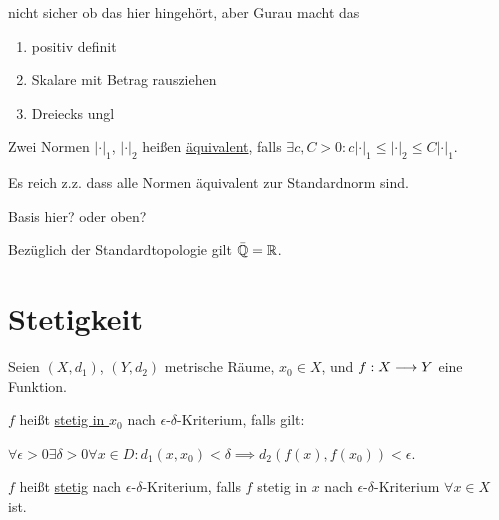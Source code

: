 \begin{query}
    nicht sicher ob das hier hingehört, aber Gurau macht das
\end{query}

\begin{definition}[Norm]
    \begin{enumerate}[label=(N\arabic*)]
        \item positiv definit
        \item Skalare mit Betrag rausziehen
        \item Dreiecks ungl
    \end{enumerate}
\end{definition}

\begin{definition}[Normäquivalenz]
    Zwei Normen $|\cdot|_1$, $|\cdot|_2$ heißen \underline{äquivalent}, falls $\exists c, C > 0: c |\cdot|_1 \leq |\cdot|_2 \leq C |\cdot|_1$.
\end{definition}

\begin{example}
    
\end{example}

\begin{proposition}
    Es reich z.z. dass alle Normen äquivalent zur Standardnorm sind.
\end{proposition}

Basis hier? oder oben?

\begin{lemma}
    Bezüglich der Standardtopologie gilt $\bar{\mathbb{Q}} = \mathbb{R}$.
\end{lemma}



\section{Stetigkeit}

\begin{definition}
    Seien $(X, d_1)$, $(Y, d_2)$ metrische Räume, $x_0 \in X$, und $f: X \longrightarrow Y$ eine Funktion.

    $f$ heißt \underline{stetig in $x_0$} nach $\epsilon$-$\delta$-Kriterium, falls gilt:

    $\forall \epsilon > 0 \exists \delta > 0 \forall x \in D: d_1(x,x_0) < \delta \implies d_2(f(x),f(x_0)) < \epsilon$.

    $f$ heißt \underline{stetig} nach $\epsilon$-$\delta$-Kriterium, falls $f$ stetig in $x$ nach $\epsilon$-$\delta$-Kriterium $\forall x \in X$ ist.
\end{definition}


